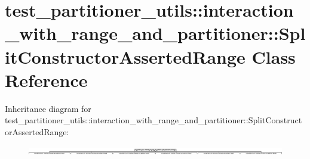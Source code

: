 \hypertarget{classtest__partitioner__utils_1_1interaction__with__range__and__partitioner_1_1SplitConstructorAssertedRange}{}\section{test\+\_\+partitioner\+\_\+utils\+:\+:interaction\+\_\+with\+\_\+range\+\_\+and\+\_\+partitioner\+:\+:Split\+Constructor\+Asserted\+Range Class Reference}
\label{classtest__partitioner__utils_1_1interaction__with__range__and__partitioner_1_1SplitConstructorAssertedRange}
Inheritance diagram for test\+\_\+partitioner\+\_\+utils\+:\+:interaction\+\_\+with\+\_\+range\+\_\+and\+\_\+partitioner\+:\+:Split\+Constructor\+Asserted\+Range\+:\begin{figure}[H]
\begin{center}
\leavevmode
\includegraphics[height=0.345679cm]{classtest__partitioner__utils_1_1interaction__with__range__and__partitioner_1_1SplitConstructorAssertedRange}
\end{center}
\end{figure}
